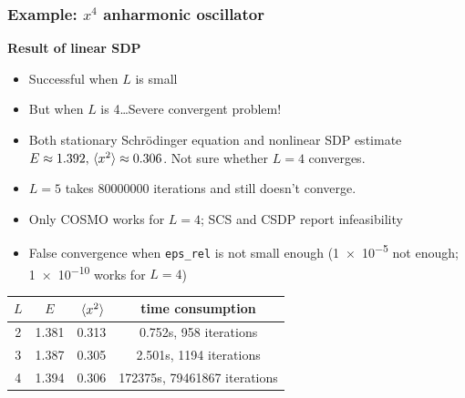 \documentclass{beamer}
\begin{document}
\begin{frame}
\frametitle{Example: $x^4$ anharmonic oscillator}

\textbf{Result of linear SDP}

\begin{itemize}
    \item Successful when $L$ is small
    \item But when $L$ is 4\dots Severe convergent problem!
    \item Both stationary Schr\"{o}dinger equation and nonlinear SDP estimate $E \approx 1.392, \expval*{x^2} \approx 0.306$. Not sure whether 
    $L=4$ converges.
    \item $L=5$ takes 80000000 iterations and still doesn't converge.
    \item Only COSMO works for $L=4$; SCS and CSDP report infeasibility
    \item False convergence when \texttt{eps\_rel} is not small enough (\num{1e-5} not enough; \num{1e-10} works for $L=4$)
\end{itemize}

\begin{center}
    \begin{tabular}{cccc}
        \toprule
          $L$ & $E$ & $\expval*{x^2}$ & time consumption \\
        \midrule
          2 & 1.381  & 0.313 & 0.752s, 958 iterations  \\
          3 & 1.387  & 0.305 & 2.501s, 1194 iterations \\
          4 & 1.394  & 0.306 & 172375s, 79461867 iterations  \\
        \bottomrule
    \end{tabular}
\end{center}

\end{frame}
\end{document}
